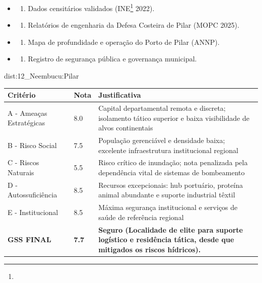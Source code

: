 {\begin{itemize}
\tightlist
\item
  \begin{enumerate}
  \def\labelenumi{\arabic{enumi})}
  \tightlist
  \item
    Dados censitários validados (INE\footnote{\fineINE} 2022).
  \end{enumerate}
\item
  \begin{enumerate}
  \def\labelenumi{\arabic{enumi})}
  \setcounter{enumi}{1}
  \tightlist
  \item
    Relatórios de engenharia da Defesa Costeira de Pilar (MOPC 2025).
  \end{enumerate}
\item
  \begin{enumerate}
  \def\labelenumi{\arabic{enumi})}
  \setcounter{enumi}{2}
  \tightlist
  \item
    Mapa de profundidade e operação do Porto de Pilar (ANNP).
  \end{enumerate}
\item
  \begin{enumerate}
  \def\labelenumi{\arabic{enumi})}
  \setcounter{enumi}{3}
  \tightlist
  \item
    Registro de segurança pública e governança municipal.
  \end{enumerate}
\end{itemize}}{dist:12_Neembucu:Pilar}
\begin{table}[ht!]
\small \begin{tabular}{p{3.0cm}p{0.8cm}p{6.0cm}} \toprule
\textbf{Critério} & \textbf{Nota} & \textbf{Justificativa} \\ \midrule
A - Ameaças Estratégicas & 8.0 & Capital departamental remota e discreta; isolamento tático superior e baixa visibilidade de alvos continentais \\
B - Risco Social & 7.5 & População gerenciável e densidade baixa; excelente infraestrutura institucional regional \\
C - Riscos Naturais & 5.5 & Risco crítico de inundação; nota penalizada pela dependência vital de sistemas de bombeamento \\
D - Autossuficiência & 8.5 & Recursos excepcionais: hub portuário, proteína animal abundante e suporte industrial têxtil \\
E - Institucional & 8.5 & Máxima segurança institucional e serviços de saúde de referência regional \\
\midrule \textbf{GSS FINAL} & \textbf{7.7} & \textbf{Seguro (Localidade de elite para suporte logístico e residência tática, desde que mitigados os riscos hídricos).} \\ \bottomrule \end{tabular}
\end{table}
